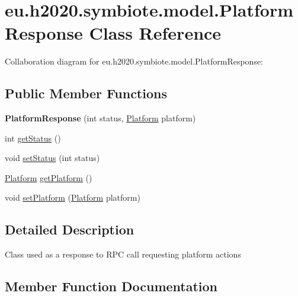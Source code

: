 \hypertarget{classeu_1_1h2020_1_1symbiote_1_1model_1_1PlatformResponse}{}\section{eu.\+h2020.\+symbiote.\+model.\+Platform\+Response Class Reference}
\label{classeu_1_1h2020_1_1symbiote_1_1model_1_1PlatformResponse}


Collaboration diagram for eu.\+h2020.\+symbiote.\+model.\+Platform\+Response\+:
\subsection*{Public Member Functions}
\begin{DoxyCompactItemize}
\item 
{\bfseries Platform\+Response} (int status, \hyperlink{classeu_1_1h2020_1_1symbiote_1_1model_1_1Platform}{Platform} platform)\hypertarget{classeu_1_1h2020_1_1symbiote_1_1model_1_1PlatformResponse_a50bf9ab9f6e33d7867ae3b9f45f5a857}{}\label{classeu_1_1h2020_1_1symbiote_1_1model_1_1PlatformResponse_a50bf9ab9f6e33d7867ae3b9f45f5a857}

\item 
int \hyperlink{classeu_1_1h2020_1_1symbiote_1_1model_1_1PlatformResponse_a36426fc2903fd48bb259295fb8421b9a}{get\+Status} ()
\item 
void \hyperlink{classeu_1_1h2020_1_1symbiote_1_1model_1_1PlatformResponse_a5266400d912196cf753e8c9ee40af151}{set\+Status} (int status)
\item 
\hyperlink{classeu_1_1h2020_1_1symbiote_1_1model_1_1Platform}{Platform} \hyperlink{classeu_1_1h2020_1_1symbiote_1_1model_1_1PlatformResponse_acf4b4148d28e4fcf1e041e1a58937ac3}{get\+Platform} ()
\item 
void \hyperlink{classeu_1_1h2020_1_1symbiote_1_1model_1_1PlatformResponse_ae3bfb1ea81733222dae4118c68b7917e}{set\+Platform} (\hyperlink{classeu_1_1h2020_1_1symbiote_1_1model_1_1Platform}{Platform} platform)
\end{DoxyCompactItemize}


\subsection{Detailed Description}
Class used as a response to R\+PC call requesting platform actions 

\subsection{Member Function Documentation}

